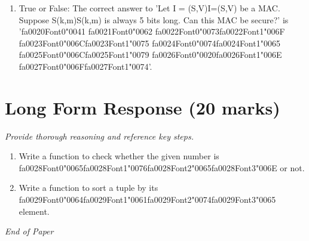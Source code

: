 \documentclass[12pt]{article}
\begin{document}
\begin{enumerate}[label=\arabic*.]
\item True or False: The correct answer to 'Let I = (S,V)I=(S,V) be a MAC. Suppose S(k,m)S(k,m) is always 5 bits long. Can this MAC be secure?' is '{\csname fa0020Font0\endcsname\char"0041} {\csname fa0021Font0\endcsname\char"0062} {\csname fa0022Font0\endcsname\char"0073}{\csname fa0022Font1\endcsname\char"006F} {\csname fa0023Font0\endcsname\char"006C}{\csname fa0023Font1\endcsname\char"0075} {\csname fa0024Font0\endcsname\char"0074}{\csname fa0024Font1\endcsname\char"0065} {\csname fa0025Font0\endcsname\char"006C}{\csname fa0025Font1\endcsname\char"0079} {\csname fa0026Font0\endcsname\char"0020}{\csname fa0026Font1\endcsname\char"006E} {\csname fa0027Font0\endcsname\char"006F}{\csname fa0027Font1\endcsname\char"0074}'.
\end{enumerate}

\section*{Long Form Response (20 marks)}
\textit{Provide thorough reasoning and reference key steps.}
\begin{enumerate}[label=\arabic*.]
\item Write a function to check whether the given number is {\csname fa0028Font0\endcsname\char"0065}{\csname fa0028Font1\endcsname\char"0076}{\csname fa0028Font2\endcsname\char"0065}{\csname fa0028Font3\endcsname\char"006E} or not.
\item Write a function to sort a tuple by its {\csname fa0029Font0\endcsname\char"0064}{\csname fa0029Font1\endcsname\char"0061}{\csname fa0029Font2\endcsname\char"0074}{\csname fa0029Font3\endcsname\char"0065} element.
\end{enumerate}

\vfill
\noindent\textit{End of Paper}
\end{document}
